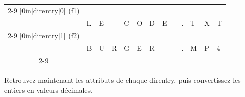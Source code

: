 \documentclass[11pt,a4paper]{article}
\begin{document}
\begin{center}


\begin{tabular}{ c   | m{0.45cm} | m{0.45cm} | m{0.45cm} | m{0.45cm} | m{0.45cm} | m{0.45cm} | m{0.45cm} | m{0.45cm} | c | m{0.45cm} | m{0.45cm} | m{0.45cm} | }
\cline{2-9} \cline{11-13}
\multirow[c]{2}{*}[0in]{direntry[0] (f1)}  & & & & & & & & &     & & & \\
                                           & L & E & - & C & O & D & E &  &  .  & T & X & T \\
\cline{2-9} \cline{11-13}
\multirow[c]{2}{*}[0in]{direntry[1] (f2)}  & & & & & & & & &     & & & \\
                                           & B & U & R & G & E & R &   &   &  .  & M & P & 4 \\
\cline{2-9} \cline{11-13}
\end{tabular}

\end{center}

\medskip

Retrouvez maintenant les attributs de chaque direntry, puis convertissez les entiers en valeurs décimales.

\end{document}
